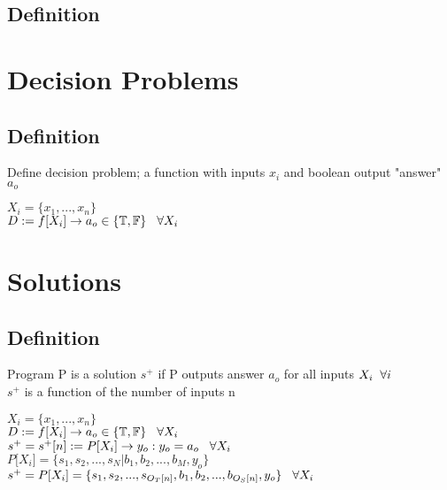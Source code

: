 \documentclass[11pt]{article}
\begin{document}
\subsection{Definition}








\newpage
\section{Decision Problems}

\subsection{Definition}
Define decision problem; a function with inputs $x_i$ and boolean output "answer" $a_o$
\begin{center}
$
X_i = \{x_1,...,x_n\}
$
\\ \vspace{2mm}
$
D := f \lbrack X_i \rbrack \rightarrow a_{o} \in \{\mathbb{T}, \mathbb{F}\} \hspace{3mm} \forall X_i
$
\end{center}







\section{Solutions}

\subsection{Definition}
Program P is a solution $s^{+}$ if P outputs answer $a_o$ for all inputs $X_i \hspace{2mm} \forall i$\\
$s^+$ is a function of the number of inputs n
\begin{center}
\vspace{1mm}
$
X_i = \{x_1,...,x_n\}
$
\\ \vspace{2mm}
$
D := f \lbrack X_i \rbrack \rightarrow a_{o} \in \{\mathbb{T}, \mathbb{F}\} \hspace{3mm} \forall X_i
$
\\ \vspace{2mm}
$
s^+ = s^+\lbrack n \rbrack := P \lbrack X_i \rbrack \rightarrow y_{o} : y_o = a_{o} \hspace{3mm} \forall X_i
$
\\ \vspace{2mm}
$
P \lbrack X_i \rbrack = \{ s_1,s_2,...,s_N| b_1, b_2,...,b_M,y_o\}
$
\\ \vspace{3mm}
$
s^+ = P \lbrack X_i \rbrack = \{ s_1,s_2,...,s_{O_T \lbrack n \rbrack }, b_1, b_2,...,b_{O_S \lbrack n \rbrack},y_o \} \hspace{3mm} \forall X_i
$
\end{center}
\end{document}
